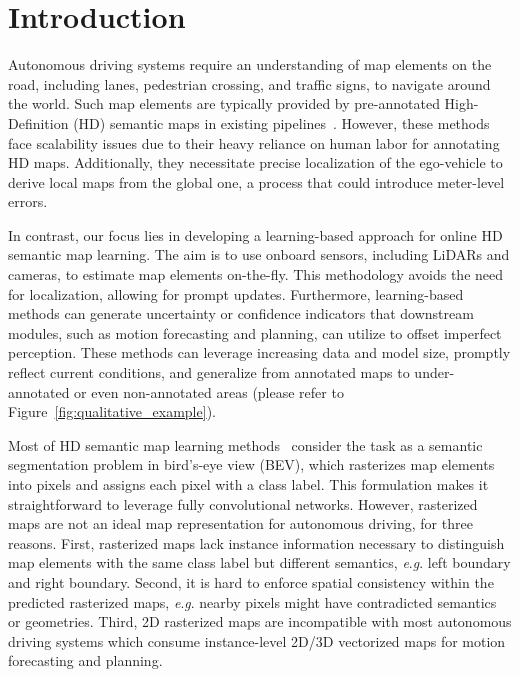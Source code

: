 \documentclass{article}
\newcommand{\eg}{\textit{e}.\textit{g}. }
\theoremstyle{plain}
\theoremstyle{definition}
\theoremstyle{remark}
\begin{document}
\vspace{-2em}
\section{Introduction}
Autonomous driving systems require an understanding of map elements on the road, including lanes, pedestrian crossing, and traffic signs, to navigate around the world. Such map elements are typically provided by pre-annotated High-Definition (HD) semantic maps in existing pipelines~\citep{rong2020lgsvl}. However, these methods face scalability issues due to their heavy reliance on human labor for annotating HD maps. Additionally, they necessitate precise localization of the ego-vehicle to derive local maps from the global one, a process that could introduce meter-level errors.

In contrast, our focus lies in developing a learning-based approach for online HD semantic map learning. The aim is to use onboard sensors, including LiDARs and cameras, to estimate map elements on-the-fly. This methodology avoids the need for localization, allowing for prompt updates. Furthermore, learning-based methods can generate uncertainty or confidence indicators that downstream modules, such as motion forecasting and planning, can utilize to offset imperfect perception. These methods can leverage increasing data and model size, promptly reflect current conditions, and generalize from annotated maps to under-annotated or even non-annotated areas (please refer to Figure~\ref{fig:qualitative_example}).

Most of HD semantic map learning methods~\citep{li2021hdmapnet,philion2020lift,roddick2020predicting,zhou2022cross} consider the task as a semantic segmentation problem in bird's-eye view (BEV), which rasterizes map elements into pixels and assigns each pixel with a class label. This formulation makes it straightforward to leverage fully convolutional networks.
However, rasterized maps are not an ideal map representation for autonomous driving, for three reasons.
First, rasterized maps lack instance information necessary to distinguish map elements with the same class label but different semantics, \eg left boundary and right boundary.
Second, it is hard to enforce spatial consistency within the predicted rasterized maps, \eg nearby pixels might have contradicted semantics or geometries.
Third, 2D rasterized maps are incompatible with most autonomous driving systems which consume instance-level 2D/3D vectorized maps for motion forecasting and planning. 
\end{document}
